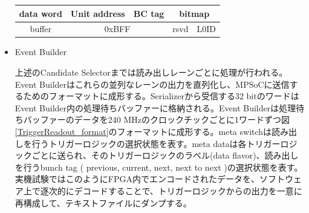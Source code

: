 \begin{itemize}
\begin{table}
{\begin{tabular}{|c|cccccccccccccccccccccccccccccccc|}
        data word & \multicolumn{6}{c|}{Unit address}                                                                                                                         & \multicolumn{2}{c|}{BC tag}                       & \multicolumn{24}{c|}{bitmap}                                                                                                                                                                                                                                                                                                                                                                                                                                                                                                                                                                                   \\ \hline
        buffer    & \multicolumn{12}{c|}{0xBFF}                                                                                                                                                                                                                                                                                           & \multicolumn{9}{c|}{rsvd}                                                                                                                                                                                                               & \multicolumn{11}{c|}{L0ID}                                                                                                                                                                                                                                   \\ \hline
        \end{tabular}
        }
    \end{table}

    \item Event Builder　　
    \par
    上述のCandidate Selectorまでは読み出しレーンごとに処理が行われる。Event Builderはこれらの並列なレーンの出力を直列化し、MPSoCに送信するためのフォーマットに成形する。Serializerから受信する32 bitのワードはEvent Builder内の処理待ちバッファーに格納される。Event Builderは処理待ちバッファーのデータを240 MHzのクロックチックごとに1ワードずつ図\ref{TriggerReadout_format}のフォーマットに成形する。meta switchは読み出しを行うトリガーロジックの選択状態を表す。meta dataは各トリガーロジックごとに送られ、そのトリガーロジックのラベル(data flavor)、読み出しを行うbunch tag ( previous, current, next, next to next )の選択状態を表す。
    実機試験ではこのようにFPGA内でエンコードされたデータを、ソフトウェア上で逐次的にデコードすることで、トリガーロジックからの出力を一意に再構成して、テキストファイルにダンプする。


\end{itemize}

